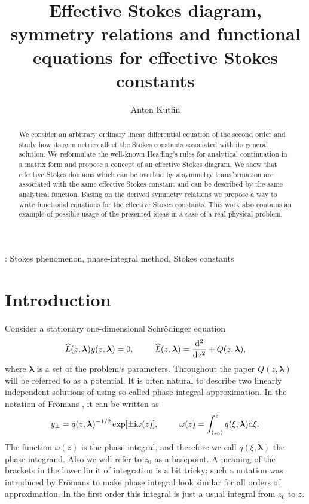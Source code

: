 \documentclass[12pt]{iopart}
\def\L{\widehat{L}}
\def\lmbd{\bm{\lambda}}
\def\w{\omega}
\newcommand\phsintgrnd[1][z]{q(#1,\lmbd)}
\newcommand\predexp[1][z]{q(#1,\lmbd)^{-1/2}}
\newcommand\phsintgrl[3][z]{\int_{#2}^{#3} \phsintgrnd[#1] \rmd #1}
\begin{document}
\title[Effective Stokes diagram and symmetry relations for effective Stokes constants]{Effective Stokes diagram, symmetry relations and functional equations for effective Stokes constants}
\author{Anton Kutlin}

\address{Institute of Applied Physics of Russian Academy of Sciences, 46 Ulyanov str., 603950 Nizhny Novgorod, Russia}



\begin{abstract}
We consider an arbitrary ordinary linear differential equation of the second order and study 
how its symmetries affect the Stokes constants associated with its general solution. 
We reformulate the well-known Heading's rules for analytical continuation in a matrix form 
and propose a concept of an effective Stokes diagram. We show that effective Stokes 
domains which can be overlaid by a symmetry transformation are associated with the same 
effective Stokes constant and can be described by the same analytical function. Basing on
the derived symmetry relations we propose a way to write functional equations for 
the effective Stokes constants. This work also contains an example of possible usage 
of the presented ideas in a case of a real physical problem.
\end{abstract}

\submitto{\jpa}

: Stokes phenomenon, phase-integral method, Stokes constants


\section{Introduction \label{sec:intro}}
Consider a stationary one-dimensional Schr\"odinger equation
\begin{eqnarray}
\L(z,\lmbd)y(z,\lmbd)=0, \qquad \L(z,\lmbd)=\frac{\rmd^2}{\rmd z^2} + Q(z,\lmbd),   \label{eq:gen}
\end{eqnarray}
where $\lmbd$ is a set of the problem`s parameters. Throughout the paper 
\mbox{$Q(z,\lmbd)$} will be referred to as a potential. It is often natural to describe two 
linearly independent solutions of  using so-called phase-integral 
approximation. In the notation of Fr\"omans \cite{frbook}, it can be written as
\begin{eqnarray}
y_\pm = \predexp \exp [\pm \rmi \w(z)], \qquad \w(z)=\phsintgrl[\xi]{(z_0)}{z}.   \label{eq:phsint}
\end{eqnarray}
The function $\w(z)$ is the phase integral, and therefore we call $\phsintgrnd[\xi]$ 
the phase integrand. Also we will refer to $z_0$ as a basepoint. A meaning of the brackets in the 
lower limit of integration is a bit tricky; such a notation was introduced by Fr\"omans \cite{frpaper} to make
phase integral look similar for all orders of approximation. In the first order this integral is just
a usual integral from $z_0$ to $z$. 
\end{document}
